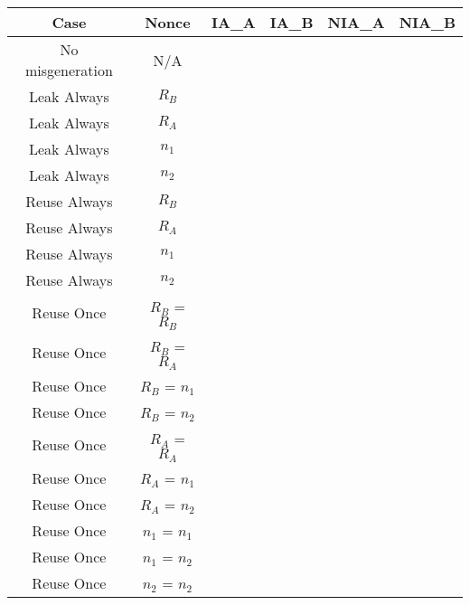 \documentclass[crop]{standalone}
\newcommand{\noattack}{\color{ForestGreen}\usym{2713}\color{black}}
\newcommand{\attack}{\color{red}\usym{2717}\color{black}}
\begin{document}
\parbox{15cm}{
\begin{tabular}{|c|c|c|c|c|c|}
\hline
Case & Nonce & IA\_A & IA\_B & NIA\_A & NIA\_B \\ \hline
No misgeneration & N/A & \noattack & \noattack & \noattack & \noattack\\ \hline
Leak Always & $R_B$ & \noattack & \noattack & \noattack & \noattack\\ \hline
Leak Always & $R_A$ & \noattack & \noattack & \noattack & \noattack\\ \hline
Leak Always & $n_1$ & \noattack & \noattack & \noattack & \noattack\\ \hline
Leak Always & $n_2$ & \noattack & \noattack & \noattack & \noattack\\ \hline
Reuse Always & $R_B$ & \noattack & \attack & \noattack & \noattack\\ \hline
Reuse Always & $R_A$ & \attack & \noattack & \noattack & \noattack\\ \hline
Reuse Always & $n_1$ & \noattack & \noattack & \noattack & \noattack\\ \hline
Reuse Always & $n_2$ & \noattack & \noattack & \noattack & \noattack\\ \hline
Reuse Once & $R_B$ = $R_B$ & \noattack & \attack & \noattack & \noattack\\ \hline
Reuse Once & $R_B$ = $R_A$ & \noattack & \noattack & \noattack & \noattack\\ \hline
Reuse Once & $R_B$ = $n_1$ & \noattack & \noattack & \noattack & \noattack\\ \hline
Reuse Once & $R_B$ = $n_2$ & \noattack & \noattack & \noattack & \noattack\\ \hline
Reuse Once & $R_A$ = $R_A$ & \attack & \noattack & \noattack & \noattack\\ \hline
Reuse Once & $R_A$ = $n_1$ & \noattack & \noattack & \noattack & \noattack\\ \hline
Reuse Once & $R_A$ = $n_2$ & \noattack & \noattack & \noattack & \noattack\\ \hline
Reuse Once & $n_1$ = $n_1$ & \noattack & \noattack & \noattack & \noattack\\ \hline
Reuse Once & $n_1$ = $n_2$ & \noattack & \noattack & \noattack & \noattack\\ \hline
Reuse Once & $n_2$ = $n_2$ & \noattack & \noattack & \noattack & \noattack\\ \hline
\end{tabular}}
\end{document}
